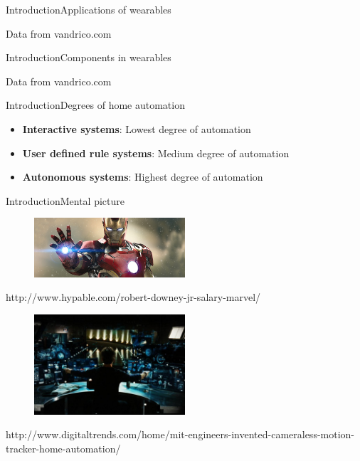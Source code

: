 \begin{frame}{Introduction}{Applications of wearables}
\centering
\begin{figure}
  \scalebox{0.8}{}
\end{figure}
{\tiny Data from vandrico.com}
\end{frame}

\begin{frame}{Introduction}{Components in wearables}
\centering
\begin{figure}
  \scalebox{0.8}{}
\end{figure}
{\tiny Data from vandrico.com}
\end{frame}

\begin{frame}{Introduction}{Degrees of home automation}
\begin{itemize}
\item \textbf{Interactive systems}: Lowest degree of automation
\item \textbf{User defined rule systems}: Medium degree of automation
\item \textbf{Autonomous systems}: Highest degree of automation
\end{itemize}
\end{frame}

\begin{frame}{Introduction}{Mental picture}
\centering
\begin{figure}
  \includegraphics[width=0.5\textwidth]{images/iron-man-1}
\end{figure}
{\tiny http://www.hypable.com/robert-downey-jr-salary-marvel/}
\begin{figure}
  \includegraphics[width=0.5\textwidth]{images/iron-man-2}
\end{figure}
{\tiny http://www.digitaltrends.com/home/mit-engineers-invented-cameraless-motion-tracker-home-automation/}
\end{frame}


